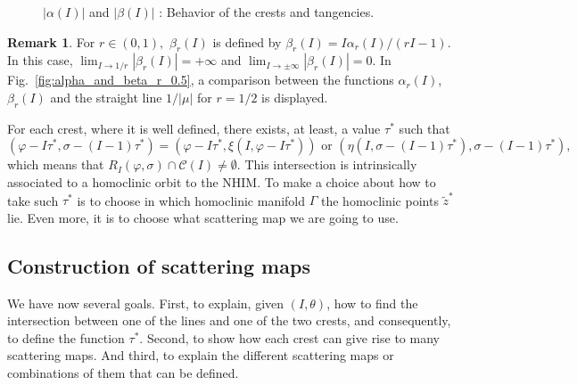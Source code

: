 \documentclass[a4paper,10pt]{article}
\newcommand{\NH}{\text{NHIM}}
\theoremstyle{definition}
\newtheorem{remark}[theorem]{Remark}
\begin{document}
\begin{figure}[h]
\centering
{}
\qquad
{}
\qquad
\caption{$\left|\alpha(I)\right|$ and $\left|\beta(I)\right|$ : Behavior of the crests and tangencies.}
\end{figure}

\begin{remark}
For $r\in (0 ,1 ),$ $\beta_r(I)$ is defined by $\beta_r(I) = I\alpha_r(I)/(rI - 1)$.
In this case, $\lim_{I\rightarrow 1/r}\left|\beta_r(I)\right| = +\infty$ and $\lim_{I \rightarrow \pm \infty}\left|\beta_r(I)\right| = 0$.
In Fig.~\ref{fig:alpha_and_beta_r_0.5}, a comparison between the functions $\alpha_r(I)$, $\beta_r(I)$ and the straight line $1/\left|\mu\right|$ for $r=1/2$ is displayed.\label{rem:r_4}
\end{remark}

For each crest, where it is well defined, there exists, at least, a  value $\tau^*$ such that
\begin{equation*}
(\varphi - I\tau^* , \sigma - (I - 1)\tau^*) = (\varphi - I\tau^* , \xi(I , \varphi - I\tau^*))\text{ or } (\eta(I ,\sigma - (I-1)\tau^* ) , \sigma - (I-1)\tau^*),
\end{equation*}
which means that $R_{I}(\varphi , \sigma)\cap \mathcal{C}(I)\neq \emptyset$.
This intersection is intrinsically associated to a homoclinic orbit to the NHIM.
To make a choice about how to take such $\tau^*$ is to choose in which homoclinic manifold $\Gamma$
the homoclinic points $\tilde{z}^*$ lie.
Even more, it is to choose what scattering map we are going to use.

\subsection{Construction of scattering maps}

We have now several goals. First, to explain, given $(I,\theta)$, how to find the intersection between one of
the {\NH} lines and one of the two crests, and consequently, to define the function $\tau^*$.
Second, to show how each crest can give rise to many scattering maps.
And third, to explain the different scattering maps or combinations of them that can be defined.
\end{document}
